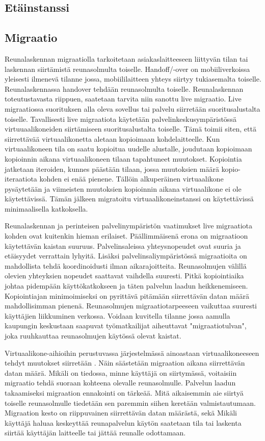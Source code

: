 \documentclass[finnish]{tktltiki2}
\theoremstyle{definition}
\theoremstyle{remark}
\begin{document}
\subsection{Etäinstanssi}
\subsection{Migraatio}
Reunalaskennan migraatiolla tarkoitetaan asiakaslaitteeseen liittyvän tilan tai laskennan siirtämistä reunasolmulta toiselle.
Handoff/-over on mobiiliverkoissa yleisesti ilmenevä tilanne jossa, mobiililaitteen yhteys siirtyy tukiasemalta toiselle.
Reunalaskennassa handover tehdään reunasolmulta toiselle. Reunalaskennan
toteutustavasta riippuen, saatetaan tarvita niin sanottu live migraatio. Live migraatiossa suorituksen alla oleva sovellus tai palvelu siirretään suoritusalustalta toiselle.
Tavallisesti live migraatiota käytetään palvelinkeskusympäristössä virtuuaalikoneiden siirtämiseen suoritusalustalta toiselle.
Tämä toimii siten, että siirrettävää virtuaalikonetta aletaan kopioimaan kohdelaitteelle. Kun virtuaalikoneen tila on saatu kopioitua uudelle alustalle, joudutaan kopioimaan kopioinnin aikana virtuaalikoneen tilaan tapahtuneet muutokset.
Kopiointia jatketaan iteroiden, kunnes päästään tilaan, jossa muutoksien määrä kopio-iteraatiota kohden ei enää pienene.
Tällöin alkuperäinen virtuaalikone pysäytetään ja viimeisten muutoksien kopioinnin aikana virtuaalikone ei ole käytettävissä. Tämän jälkeen migratoitu virtuaalikoneinstanssi on käytettävissä minimaalisella katkoksella. \cite{ha2015adaptive}

Reunalaskennan ja perinteisen palvelinympäristön vaatimukset live migraatiota kohden ovat kuitenkin hieman erilaiset. Päällimmäisenä erona on migraatioon käytettävän kaistan suuruus. Palvelinsaleissa yhteysnopeudet ovat suuria ja etäisyydet verrattain lyhyitä. Lisäksi palvelinsaliympäristössä migraatioita on mahdollista tehdä koordinoidusti ilman aikarajoitteita.
Reunasolmujen välillä olevien yhteyksien nopeudet saattavat vaihdella suuresti.
Pitkä kopiointiaika johtaa pidempään käyttökatkokseen ja täten palvelun laadun heikkenemiseen. Kopiointiajan minimoimiseksi on pyrittävä pitämään siirrettävän datan määrä mahdollisimman pienenä. Reunasolmujen migraatiotarpeeseen vaikuttaa suuresti käyttäjien liikkuminen verkossa. Voidaan kuvitella tilanne jossa aamulla kaupungin keskustaan saapuvat työmatkailijat aiheuttavat "migraatiotulvan", joka ruuhkauttaa reunasolmujen käytössä olevat kaistat.  

Virtuaalikone-aihioihin perustuvassa järjestelmässä ainoastaan virtuaalikoneeseen tehdyt muutokset siirretään \cite{RefWorks:doc:5a65a533e4b0451a693fbf8e}. Näin säästetään migraation aikana siirrettävän datan määrä.
Mikäli on tiedossa, minne käyttäjä on siirtymässä, voitaisiin migraatio tehdä suoraan kohteena olevalle reunasolmulle.
Palvelun laadun takaamiseksi migraation ennakointi on tärkeää. Mitä aikaisemmin aie siirtyä toiselle reunasolmulle tiedetään sen paremmin siihen keretään valmistautumaan. 
Migraation kesto on riippuvainen siirrettävän datan määrästä, sekä
Mikäli käyttäjä haluaa keskeyttää reunapalvelun käytön saatetaan tila tai laskenta siirtää käyttäjän laitteelle tai jättää reunalle odottamaan.
\end{document}
